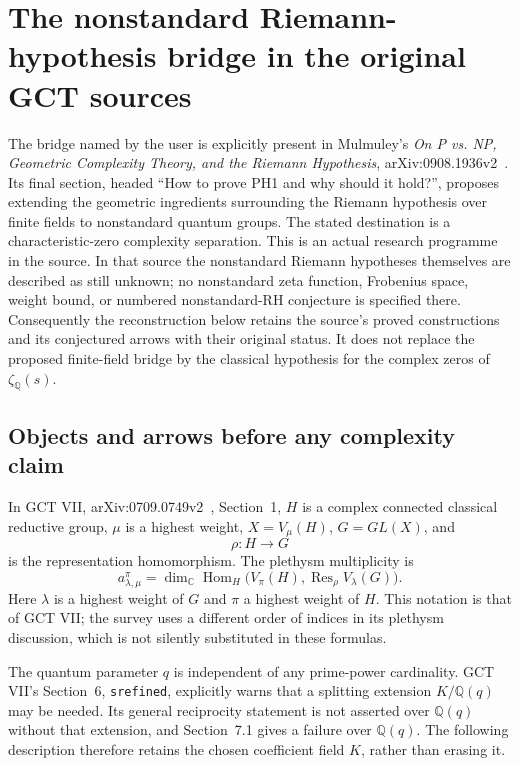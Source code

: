 \section{The nonstandard Riemann-hypothesis bridge in the original GCT sources}
\label{sec:gct-nrh-source-bridge}

The bridge named by the user is explicitly present in Mulmuley's
\emph{On P vs. NP, Geometric Complexity Theory, and the Riemann Hypothesis},
arXiv:0908.1936v2~\cite{mulmuley2009gctrh}.  Its final section, headed ``How to prove PH1 and why
should it hold?'', proposes extending the geometric ingredients surrounding
the Riemann hypothesis over finite fields to nonstandard quantum groups.
The stated destination is a characteristic-zero complexity separation.
This is an actual research programme in the source.  In that source the
nonstandard Riemann hypotheses themselves are described as still unknown;
no nonstandard zeta function, Frobenius space, weight bound, or numbered
nonstandard-RH conjecture is specified there.  Consequently the reconstruction
below retains the source's proved constructions and its conjectured arrows
with their original status.  It does not replace the proposed finite-field
bridge by the classical hypothesis for the complex zeros of
$\zeta_{\mathbb Q}(s)$.

\subsection{Objects and arrows before any complexity claim}

In GCT VII, arXiv:0709.0749v2~\cite{mulmuley2008gct7}, Section~1, $H$ is a complex connected
classical reductive group, $\mu$ is a highest weight,
$X=V_\mu(H)$, $G=GL(X)$, and
\[
 \rho:H\longrightarrow G
\]
is the representation homomorphism.  The plethysm multiplicity is
\[
 a_{\lambda,\mu}^{\pi}
 =\dim_{\mathbb C}\operatorname{Hom}_{H}
       \bigl(V_\pi(H),\operatorname{Res}_{\rho}V_\lambda(G)\bigr).
\]
Here $\lambda$ is a highest weight of $G$ and $\pi$ a highest weight of
$H$.  This notation is that of GCT VII; the survey uses a different order
of indices in its plethysm discussion, which is not silently substituted
in these formulas.

The quantum parameter $q$ is independent of any prime-power cardinality.
GCT VII's Section~6, \texttt{srefined}, explicitly warns that a splitting
extension $K/\mathbb Q(q)$ may be needed.  Its general reciprocity statement
is not asserted over $\mathbb Q(q)$ without that extension, and Section~7.1
gives a failure over $\mathbb Q(q)$.  The following description therefore
retains the chosen coefficient field $K$, rather than erasing it.

